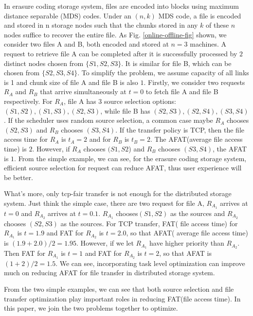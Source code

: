 \documentclass{IEEEtran}
\begin{document}
In erasure coding storage system,  files are encoded into blocks using maximum distance separable (MDS) codes.
Under an $(n, k)$ MDS code, a file is encoded and stored in n storage nodes such that the chunks stored in any $k$ of these $n$ nodes suffice to recover the entire file. 
As Fig. \ref{online-offline-fig} shown, we consider two files A and B, both encoded and stored at $n=3$ machines.
A request to retrieve file A can be completed after it is successfully processed by $2$ distinct nodes chosen from $\{S1,S2,S3\}$.
It is similar for file B, which can be chosen from $ \{S2,S3,S4\}$.
To simplify the problem, we assume capacity of all links is 1 and chunk size of file A and file B is also $1$.
Firstly, we consider two requests $R_{A}$ and $R_{B}$ that arrive simultaneously at $ t =0$ to fetch file A and file B respectively.
For $R_{A}$, file A has $3$ source selection options: $(S1,S2), (S1,S3), (S2,S3)$, while file B has $(S2,S3), (S2,S4), (S3,S4)$.
If the scheduler uses random source selection, a common case maybe $R_{A}$ chooses $(S2,S3)$ and $R_{B}$ chooses $(S3,S4)$.
If the transfer policy is TCP, then the file access time for $R_{A}$ is $t_{A}=2$ and for  $R_{B}$ is $t_{B}=2$.
The AFAT(average file access time) is $2$.
However, if $R_{A}$ chooses $(S1,S2$) and $R_{B}$ chooses $(S3,S4)$, the AFAT is $1$. 
From the simple example, we can see, for the erasure coding storage system, 
efficient source selection for request can reduce AFAT, thus user experience will be better.

What's more, only tcp-fair transfer is not enough for the distributed storage system.
Just think the simple case, there are two request for file A, $R_{A_1}$ arrives at $t=0$ and $R_{A_2}$ arrives at $t=0.1$.
$R_{A_1}$ chooses$ (S1,S2)$ as the sources and $R_{A_2}$ chooses $(S2,S3)$ as the sources.
For TCP transfer, FAT( file access time) for $R_{A_1}$ is $t=1.9$ and FAT for $R_{A_2}$ is $t=2.0$,
so that AFAT( average file access time)  is $(1.9+2.0)/2=1.95$.
However, if we let $R_{A_1}$  have higher priority than  $R_{A_2}$.
Then FAT for $R_{A_1}$ is $t=1$ and FAT for $R_{A_2}$ is $t=2$,
so that AFAT is $(1+2)/2=1.5$. 
We can see, incorporating task level optimization can improve much on reducing AFAT for file transfer in distributed storage system.

From the two simple examples, we can see that both source selection and file transfer optimization play important roles
in reducing FAT(file access time).
In this paper, we join the two problems together to optimize.
\end{document}
